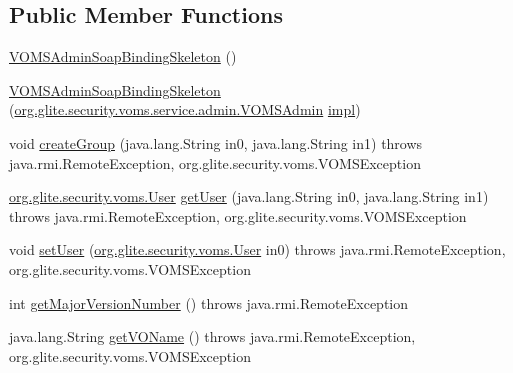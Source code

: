 \subsection*{Public Member Functions}
\begin{DoxyCompactItemize}
\item 
\hyperlink{classorg_1_1glite_1_1security_1_1voms_1_1service_1_1admin_1_1VOMSAdminSoapBindingSkeleton_a178334571c4a147a715ac7236c5ac637}{VOMSAdminSoapBindingSkeleton} ()
\item 
\hyperlink{classorg_1_1glite_1_1security_1_1voms_1_1service_1_1admin_1_1VOMSAdminSoapBindingSkeleton_af287483871460e2022ca5a813efdddd6}{VOMSAdminSoapBindingSkeleton} (\hyperlink{interfaceorg_1_1glite_1_1security_1_1voms_1_1service_1_1admin_1_1VOMSAdmin}{org.glite.security.voms.service.admin.VOMSAdmin} \hyperlink{classorg_1_1glite_1_1security_1_1voms_1_1service_1_1admin_1_1VOMSAdminSoapBindingSkeleton_a25375d5138b17d662d53925796daaf74}{impl})
\item 
void \hyperlink{classorg_1_1glite_1_1security_1_1voms_1_1service_1_1admin_1_1VOMSAdminSoapBindingSkeleton_a22c81972a8719ac7b276db0ecc7d77ef}{createGroup} (java.lang.String in0, java.lang.String in1)  throws java.rmi.RemoteException, org.glite.security.voms.VOMSException     
\item 
\hyperlink{classorg_1_1glite_1_1security_1_1voms_1_1User}{org.glite.security.voms.User} \hyperlink{classorg_1_1glite_1_1security_1_1voms_1_1service_1_1admin_1_1VOMSAdminSoapBindingSkeleton_ac1574c3ac02fc1889e1ce87556e19a83}{getUser} (java.lang.String in0, java.lang.String in1)  throws java.rmi.RemoteException, org.glite.security.voms.VOMSException     
\item 
void \hyperlink{classorg_1_1glite_1_1security_1_1voms_1_1service_1_1admin_1_1VOMSAdminSoapBindingSkeleton_a9d845ebe4d2924b9a4acadb3b9109833}{setUser} (\hyperlink{classorg_1_1glite_1_1security_1_1voms_1_1User}{org.glite.security.voms.User} in0)  throws java.rmi.RemoteException, org.glite.security.voms.VOMSException     
\item 
int \hyperlink{classorg_1_1glite_1_1security_1_1voms_1_1service_1_1admin_1_1VOMSAdminSoapBindingSkeleton_a559033f9ce9afd516aae7d7ac2751831}{getMajorVersionNumber} ()  throws java.rmi.RemoteException     
\item 
java.lang.String \hyperlink{classorg_1_1glite_1_1security_1_1voms_1_1service_1_1admin_1_1VOMSAdminSoapBindingSkeleton_a43de2f5656715422a972394ce4c1d7a3}{getVOName} ()  throws java.rmi.RemoteException, org.glite.security.voms.VOMSException     

\end{DoxyCompactItemize}
